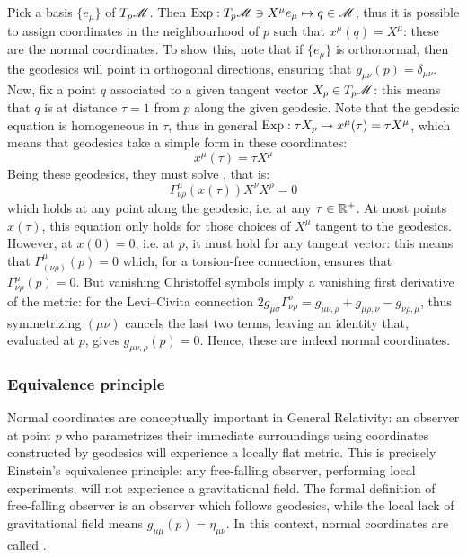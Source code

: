 Pick a basis $ \{e_\mu\} $ of $ T_p \mathscr{M} $. Then $ \operatorname{Exp} : T_p \mathscr{M} \ni X^\mu e_\mu \mapsto q \in \mathscr{M} $, thus it is possible to assign coordinates in the neighbourhood of $ p $ such that $ x^\mu(q) = X^\mu $: these are the normal coordinates. To show this, note that if $ \{e_\mu\} $ is orthonormal, then the geodesics will point in orthogonal directions, ensuring that $ g_{\mu \nu}(p) = \delta_{\mu \nu} $. Now, fix a point $ q $ associated to a given tangent vector $ X_p \in T_p \mathscr{M} $: this means that $ q $ is at distance $ \tau = 1 $ from $ p $ along the given geodesic. Note that the geodesic equation is homogeneous in $ \tau $, thus in general $ \operatorname{Exp} : \tau X_p \mapsto x^\mu(\tau) = \tau X^\mu $, which means that geodesics take a simple form in these coordinates:
\begin{equation*}
  x^\mu (\tau) = \tau X^\mu
\end{equation*}
Being these geodesics, they must solve , that is:
\begin{equation*}
  \Gamma^\mu_{\nu \rho}(x(\tau)) X^\nu X^\rho = 0
\end{equation*}
which holds at any point along the geodesic, i.e. at any $ \tau \in \mathbb{R}^+ $. At most points $ x(\tau) $, this equation only holds for those choices of $ X^\mu $ tangent to the geodesics. However, at $ x(0) = 0 $, i.e. at $ p $, it must hold for any tangent vector: this means that $ \Gamma^\mu_{(\nu \rho)}(p) = 0 $ which, for a torsion-free connection, ensures that $ \Gamma^\mu_{\nu \rho}(p) = 0 $. But vanishing Christoffel symbols imply a vanishing first derivative of the metric: for the Levi--Civita connection $ 2g_{\mu \sigma} \Gamma^\sigma_{\nu \rho} = g_{\mu \nu, \rho} + g_{\mu \rho, \nu} - g_{\nu \rho, \mu} $, thus symmetrizing $ (\mu \nu) $ cancels the last two terms, leaving an identity that, evaluated at $ p $, gives $ g_{\mu \nu, \rho}(p) = 0 $. Hence, these are indeed normal coordinates.

\subsubsection{Equivalence principle}

Normal coordinates are conceptually important in General Relativity: an observer at point $ p $ who parametrizes their immediate surroundings using coordinates constructed by geodesics will experience a locally flat metric. This is precisely Einstein's equivalence principle: any free-falling observer, performing local experiments, will not experience a gravitational field. The formal definition of free-falling observer is an observer which follows geodesics, while the local lack of gravitational field means $ g_{\mu \mu}(p) = \eta_{\mu \nu} $. In this context, normal coordinates are called .

